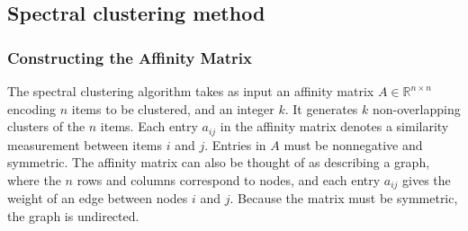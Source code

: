 \documentclass[11pt]{article}
\begin{document}

\subsection{Spectral clustering method}
\subsubsection{Constructing the Affinity Matrix}

The spectral clustering algorithm \cite{yu2003multiclass} takes as input an affinity matrix $A \in \mathbb{R}^{n\times n}$ encoding $n$ items to be clustered, and an integer $k$. It generates $k$ non-overlapping clusters of the $n$ items. Each entry $a_{ij}$ in the affinity matrix denotes a similarity measurement between items $i$ and $j$. Entries in $A$ must be nonnegative and symmetric. The affinity matrix can also be thought of as describing a graph, where the $n$ rows and columns correspond to nodes, and each entry $a_{ij}$ gives the weight of an edge between nodes $i$ and $j$. Because the matrix must be symmetric, the graph is undirected.
\end{document}
